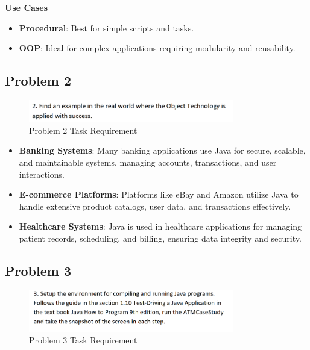 \documentclass{article}
\begin{document}
\textbf{Use Cases}
\begin{itemize}
    \item \textbf{Procedural}: Best for simple scripts and tasks.
    \item \textbf{OOP}: Ideal for complex applications requiring modularity and reusability.
\end{itemize}

\subsection*{Problem 2}

\begin{figure}[H]
    \centering
   
    \includegraphics[width=0.8\textwidth]{./Assets/Task requirements/Assignment1/2.png}
    \caption{Problem 2 Task Requirement}
\end{figure}

\begin{itemize}
    \item \textbf{Banking Systems}: Many banking applications use Java for secure, scalable, and maintainable systems, managing accounts, transactions, and user interactions.
    \item \textbf{E-commerce Platforms}: Platforms like eBay and Amazon utilize Java to handle extensive product catalogs, user data, and transactions effectively.
    \item \textbf{Healthcare Systems}: Java is used in healthcare applications for managing patient records, scheduling, and billing, ensuring data integrity and security.
\end{itemize}

\subsection*{Problem 3}

\begin{figure}[H]
    \centering
    \includegraphics[width=0.8\textwidth]{./Assets/Task requirements/Assignment1/3.png}
    \caption{Problem 3 Task Requirement}
\end{figure}
\end{document}
